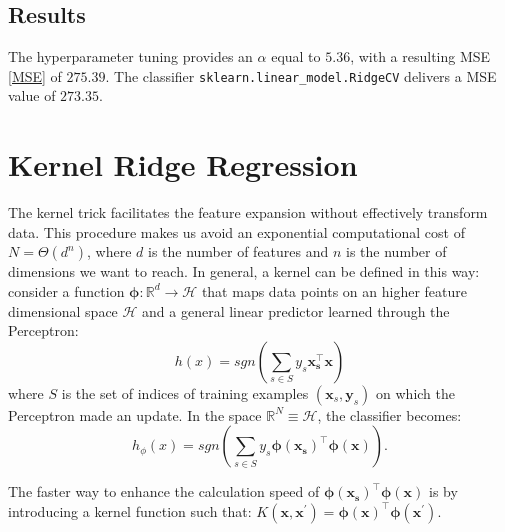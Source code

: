 \documentclass{article}
\begin{document}
\subsection{Results}
The hyperparameter tuning provides an $\alpha$ equal to $5.36$, with a resulting MSE \eqref{MSE} of $275.39$. The classifier \texttt{sklearn.linear\_model.RidgeCV} delivers a MSE value of $273.35$.

\section{Kernel Ridge Regression}
The kernel trick facilitates the feature expansion without effectively transform data. This procedure makes us avoid an exponential computational cost of $N = \Theta(d^n)$, where $d$ is the number of features and $n$ is the number of dimensions we want to reach. In general, a kernel can be defined in this way: consider a function $\boldsymbol{\phi}: \mathbb{R}^d \rightarrow \mathcal{H}$ that maps data points on an higher feature dimensional space $\mathcal{H}$ and a general linear predictor learned through the Perceptron: \begin{equation}
h(x) = sgn\left(\sum_{s \in S}y_s\boldsymbol{x_s^\top}\boldsymbol{x}\right)
\end{equation} where $S$ is the set of indices of training examples $(\boldsymbol{x}_s,\boldsymbol{y}_s)$ on which the Perceptron made an update. In the space $\mathbb{R}^N \equiv \mathcal{H}$, the classifier becomes: \begin{equation}
h{_\phi}(x) = sgn\left(\sum_{s \in S}y_s\boldsymbol{\phi(x_s)^\top}\boldsymbol{\phi(x)}\right).
\end{equation}
    
    
The faster way to enhance the calculation speed of $\boldsymbol{\phi(x_s)^\top}\boldsymbol{\phi(x)}$ is by introducing a kernel function such that: $K(\boldsymbol{x},\boldsymbol{x^\prime}) = \boldsymbol{\phi(x)^\top}\boldsymbol{\phi(x^\prime)}.$
\end{document}
